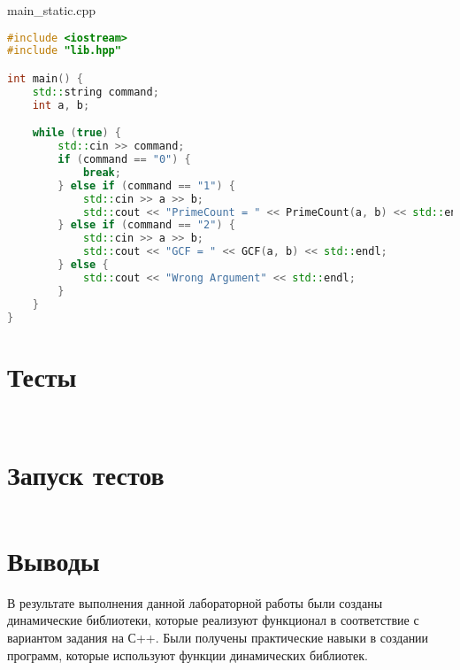 \documentclass[a4paper, 12pt]{article}
\begin{document}
main\_static.cpp
\begin{lstlisting}[language=C++]
#include <iostream>
#include "lib.hpp"

int main() {
    std::string command;
    int a, b;

    while (true) {
        std::cin >> command;
        if (command == "0") {
            break;
        } else if (command == "1") {
            std::cin >> a >> b;
            std::cout << "PrimeCount = " << PrimeCount(a, b) << std::endl;
        } else if (command == "2") {
            std::cin >> a >> b;
            std::cout << "GCF = " << GCF(a, b) << std::endl;
        } else {
            std::cout << "Wrong Argument" << std::endl;
        }
    }
}
\end{lstlisting}

\newpage
\section{Тесты}
\begin{lstlisting}[language=C++]

\end{lstlisting}

\begin{lstlisting}[language=C++]

\end{lstlisting}
\newpage

\section{Запуск тестов}
\begin{verbatim}

\end{verbatim}
\newpage

\section{Выводы}

В результате выполнения данной лабораторной работы были созданы динамические библиотеки, которые реализуют функционал в соответствие с вариантом задания на С++. Были получены практические навыки в создании программ, которые используют функции динамических библиотек.
\end{document}

